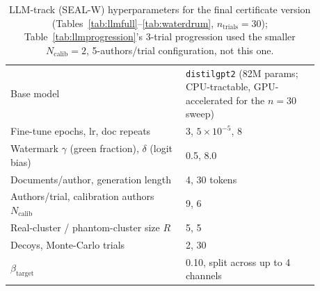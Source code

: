 \documentclass[10pt,journal,compsoc]{IEEEtran}
\begin{document}
\begin{table}[t]
\centering
\footnotesize
\caption{LLM-track (SEAL-W) hyperparameters for the final certificate version (Tables~\ref{tab:llmfull}--\ref{tab:waterdrum}, $n_{\text{trials}}{=}30$); Table~\ref{tab:llmprogression}'s 3-trial progression used the smaller $N_{\text{calib}}{=}2$, 5-authors/trial configuration, not this one.}
\label{tab:hyperparams-llm}
\begin{tabular}{@{}p{0.5\linewidth}p{0.38\linewidth}@{}}
\toprule
Base model & \texttt{distilgpt2} (82M params; CPU-tractable, GPU-accelerated for the $n{=}30$ sweep) \\
Fine-tune epochs, lr, doc repeats & 3, $5{\times}10^{-5}$, 8 \\
Watermark $\gamma$ (green fraction), $\delta$ (logit bias) & 0.5, 8.0 \\
Documents/author, generation length & 4, 30 tokens \\
Authors/trial, calibration authors $N_{\text{calib}}$ & 9, 6 \\
Real-cluster / phantom-cluster size $R$ & 5, 5 \\
Decoys, Monte-Carlo trials & 2, 30 \\
$\beta_{\text{target}}$ & 0.10, split across up to 4 channels \\
\bottomrule
\end{tabular}
\end{table}
\end{document}
